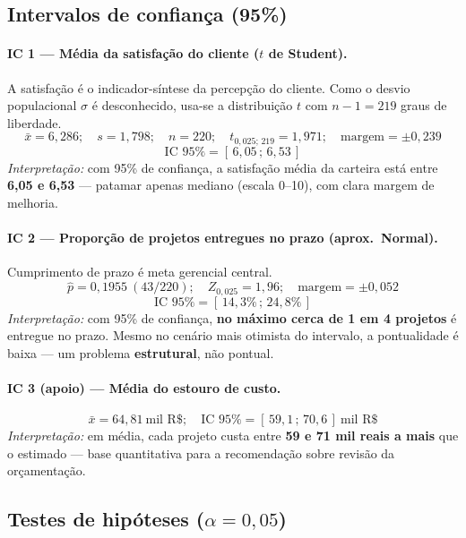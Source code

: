 \documentclass[a4paper, 12pt]{article}
\begin{document}
\subsection{Intervalos de confiança (95\%)}
\label{sec:ic}

\paragraph{IC 1 --- Média da satisfação do cliente ($t$ de Student).}
A satisfação é o indicador-síntese da percepção do cliente. Como o desvio
populacional $\sigma$ é desconhecido, usa-se a distribuição $t$ com
$n-1 = 219$ graus de liberdade.
\[
\bar{x} = 6{,}286;\quad s = 1{,}798;\quad n = 220;\quad t_{0{,}025;\,219} = 1{,}971;
\quad \text{margem} = \pm 0{,}239
\]
\[
\boxed{\text{IC 95\%} = [\,6{,}05\,;\,6{,}53\,]}
\]
\emph{Interpretação:} com 95\% de confiança, a satisfação média da carteira está
entre \textbf{6,05 e 6,53} --- patamar apenas mediano (escala 0--10), com clara
margem de melhoria.

\paragraph{IC 2 --- Proporção de projetos entregues no prazo (aprox.\ Normal).}
Cumprimento de prazo é meta gerencial central.
\[
\hat{p} = 0{,}1955\ (43/220);\quad Z_{0{,}025} = 1{,}96;\quad \text{margem} = \pm 0{,}052
\]
\[
\boxed{\text{IC 95\%} = [\,14{,}3\%\,;\,24{,}8\%\,]}
\]
\emph{Interpretação:} com 95\% de confiança, \textbf{no máximo cerca de 1 em 4
projetos} é entregue no prazo. Mesmo no cenário mais otimista do intervalo, a
pontualidade é baixa --- um problema \textbf{estrutural}, não pontual.

\paragraph{IC 3 (apoio) --- Média do estouro de custo.}
\[
\bar{x} = 64{,}81\ \text{mil R\$};\quad \boxed{\text{IC 95\%} = [\,59{,}1\,;\,70{,}6\,]\ \text{mil R\$}}
\]
\emph{Interpretação:} em média, cada projeto custa entre \textbf{59 e 71 mil reais
a mais} que o estimado --- base quantitativa para a recomendação sobre revisão da
orçamentação.

\subsection{Testes de hipóteses ($\alpha = 0{,}05$)}
\label{sec:testes}
\end{document}
